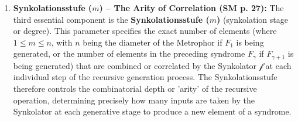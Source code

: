 \documentclass[12pt]{article}
\newcommand{\synkolator}{\mathcal{f}}
\newcommand{\synkolationsstufe}{m}
\newcommand{\syndrom}{F}
\begin{document}
\begin{enumerate}
    \item \textbf{Synkolationsstufe (\( \synkolationsstufe \)) – The Arity of Correlation (SM p. 27):}
    The third essential component is the \textbf{Synkolationsstufe (\( \synkolationsstufe \))} (synkolation stage or degree). This parameter specifies the exact number of elements (where \( 1 \leq \synkolationsstufe \leq n \), with \( n \) being the diameter of the Metrophor if \( \syndrom_1 \) is being generated, or the number of elements in the preceding syndrome \( \syndrom_\gamma \) if \( \syndrom_{\gamma+1} \) is being generated) that are combined or correlated by the Synkolator \( \synkolator \) at each individual step of the recursive generation process. The Synkolationsstufe therefore controls the combinatorial depth or 'arity' of the recursive operation, determining precisely how many inputs are taken by the Synkolator at each generative stage to produce a new element of a syndrome.
\end{enumerate}
\end{document}
